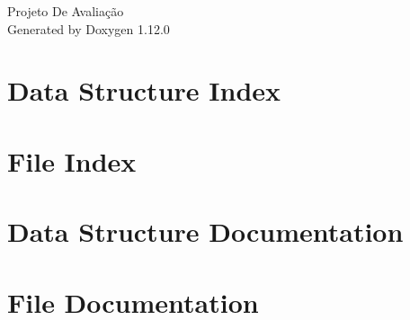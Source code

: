 \documentclass[twoside]{book}
\newcommand{\+}{\discretionary{\mbox{\scriptsize$\hookleftarrow$}}{}{}}
\newcommand{\clearemptydoublepage}{%
    \newpage{\pagestyle{empty}\cleardoublepage}%
  }
\begin{document}
  \raggedbottom
    \hypersetup{pageanchor=false,
                bookmarksnumbered=true,
                pdfencoding=unicode
               }
  \begin{titlepage}
  \vspace*{7cm}
  \begin{center}%
  {\Large Projeto De Avaliação}\\
  \vspace*{1cm}
  {\large Generated by Doxygen 1.12.0}\\
  \end{center}
  \end{titlepage}
  \clearemptydoublepage
  \tableofcontents
  \clearemptydoublepage
  \hypersetup{pageanchor=true}
\chapter{Data Structure Index}

\chapter{File Index}

\chapter{Data Structure Documentation}














\chapter{File Documentation}











  \backmatter
  \newpage
  \clearemptydoublepage
  \printindex
\end{document}
